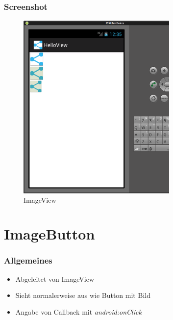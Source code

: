 \begin{frame}
   \frametitle{Screenshot}
	\begin{figure}[h!]
	  \centering
	  \includegraphics[width=0.7\textwidth]{pictures/imageview.ps}
	  \caption{
		  ImageView
	  }
	  \label{fig:imageview}
	\end{figure}
\end{frame}

\section{ImageButton}
\begin{frame}
   \frametitle{Allgemeines}
   \begin{itemize}
      \item Abgeleitet von ImageView
      \item Sieht normalerweise aus wie Button mit Bild
      \item Angabe von Callback mit \emph{android:onClick}
   \end{itemize}
   
	
	
	
\end{frame}

